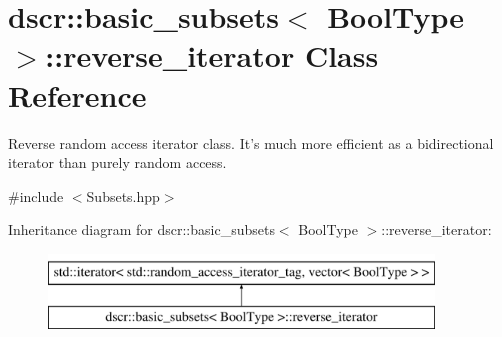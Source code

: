 \hypertarget{classdscr_1_1basic__subsets_1_1reverse__iterator}{\section{dscr\-:\-:basic\-\_\-subsets$<$ Bool\-Type $>$\-:\-:reverse\-\_\-iterator Class Reference}
\label{classdscr_1_1basic__subsets_1_1reverse__iterator}
}


Reverse random access iterator class. It's much more efficient as a bidirectional iterator than purely random access.  




{\ttfamily \#include $<$Subsets.\-hpp$>$}

Inheritance diagram for dscr\-:\-:basic\-\_\-subsets$<$ Bool\-Type $>$\-:\-:reverse\-\_\-iterator\-:\begin{figure}[H]
\begin{center}
\leavevmode
\includegraphics[height=2.000000cm]{classdscr_1_1basic__subsets_1_1reverse__iterator}
\end{center}
\end{figure}
